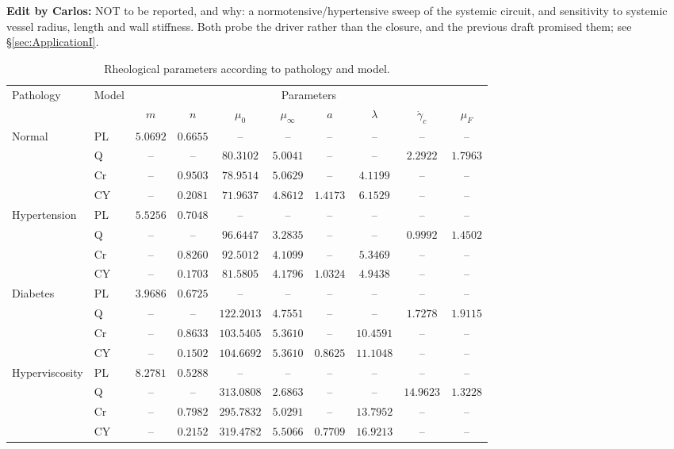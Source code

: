 \documentclass[lineno]{jfm}
\newcommand{\cbp}[1]{{\color{blue} \textbf{Edit by Carlos:} #1}}
\begin{document}
\cbp{NOT to be reported, and why: a normotensive/hypertensive sweep of the
systemic circuit, and sensitivity to systemic vessel radius, length and wall
stiffness. Both probe the driver rather than the closure, and the previous draft
promised them; see \S\ref{sec:ApplicationI}.}

%


\begin{table}
    \begin{center}
    \begin{tabular}{l l c c c c c c c c}
        \hline
        Pathology & Model & \multicolumn{8}{c}{Parameters} \\
        \cline{3-10}
        & & $m$ & $n$ & $\mu_0$ & $\mu_\infty$ & $a$ & $\lambda$ & $\dot{\gamma}_c$ & $\mu_F$\\
        \hline
        Normal
         & PL & $5.0692$ & $0.6655$ & -- & -- & -- & -- & -- & -- \\
         & Q  & -- & -- & $80.3102$ & $5.0041$ & -- & -- & $2.2922$ & $1.7963$ \\
         & Cr & -- & $0.9503$ & $78.9514$ & $5.0629$ & -- & $4.1199$ & -- & -- \\
         & CY & -- & $0.2081$ & $71.9637$ & $4.8612$ & $1.4173$ & $6.1529$ & -- & -- \\
        [5pt] %
        Hypertension
         & PL & $5.5256$ & $0.7048$ & -- & -- & -- & -- & -- & -- \\
         & Q  & -- & -- & $96.6447$ & $3.2835$ & -- & -- & $0.9992$ & $1.4502$ \\
         & Cr & -- & $0.8260$ & $92.5012$ & $4.1099$ & -- & $5.3469$ & -- & -- \\
         & CY & -- & $0.1703$ & $81.5805$ & $4.1796$ & $1.0324$ & $4.9438$ & -- & -- \\
        [5pt]
        Diabetes
         & PL & $3.9686$ & $0.6725$ & -- & -- & -- & -- & -- & -- \\
         & Q  & -- & -- & $122.2013$ & $4.7551$ & -- & -- & $1.7278$ & $1.9115$ \\
         & Cr & -- & $0.8633$ & $103.5405$ & $5.3610$ & -- & $10.4591$ & -- & -- \\
         & CY & -- & $0.1502$ & $104.6692$ & $5.3610$ & $0.8625$ & $11.1048$ & -- & -- \\
        [5pt]
        Hyperviscosity
         & PL & $8.2781$ & $0.5288$ & -- & -- & -- & -- & -- & -- \\
         & Q  & -- & -- & $313.0808$ & $2.6863$ & -- & -- & $14.9623$ & $1.3228$ \\
         & Cr & -- & $0.7982$ & $295.7832$ & $5.0291$ & -- & $13.7952$ & -- & -- \\
         & CY & -- & $0.2152$ & $319.4782$ & $5.5066$ & $0.7709$ & $16.9213$ & -- & -- \\
        \hline
    \end{tabular}
    \caption{Rheological parameters according to pathology and model.}
    \label{tab:parametros_reologicos}
    \end{center}
\end{table} 
\end{document}
